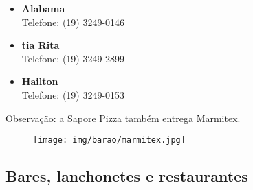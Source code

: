 \begin{itemize}
    \item   \textbf{Alabama}
        \\Telefone: (19) 3249-0146

    \item   \textbf{tia Rita}
        \\Telefone: (19) 3249-2899

    \item   \textbf{Hailton}
        \\Telefone: (19) 3249-0153
\end{itemize}

Observação: a Sapore Pizza também entrega Marmitex.

\begin{figure}[h!]
    \centering
    \texttt{[image: img/barao/marmitex.jpg]}
\end{figure}

\subsection{Bares, lanchonetes e restaurantes}

